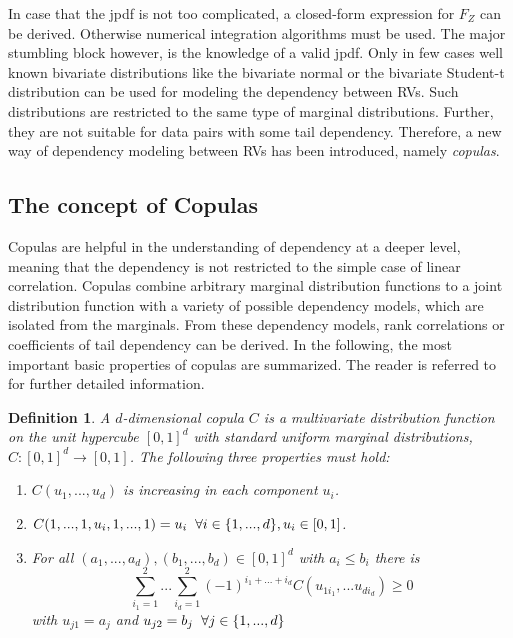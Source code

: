 \documentclass[a4paper]{article}
\begin{document}
In case that the jpdf is not too complicated, a closed-form expression for $F_Z$ can be derived. Otherwise numerical integration algorithms must be used. The major stumbling block however, is the knowledge of a valid jpdf. Only in few cases well known bivariate distributions like the bivariate normal or the bivariate Student-t distribution can be used for modeling the dependency between RVs. Such distributions are restricted to the same type of marginal distributions. Further, they are not suitable for data pairs with some tail dependency. Therefore, a new way of dependency modeling between RVs has been introduced, namely {\it copulas}.
 

\subsection{The concept of Copulas}
Copulas are helpful in the understanding of dependency at a deeper level, meaning that the dependency is not restricted to the simple case of linear correlation. Copulas combine arbitrary marginal distribution functions to a joint distribution function with a variety of possible dependency models, which are isolated from the marginals. From these dependency models, rank correlations or coefficients of tail dependency can be derived. In the following, the most important basic properties of copulas are summarized. The reader is referred to \cite{NEL06,MFE05} for further detailed information. 

\newtheorem{definition}{Definition}
\begin{definition}
	A $d$-dimensional copula $C$ is a multivariate distribution function on the unit hypercube $[0,1]^d$ with standard uniform marginal distributions, $C:[0,1]^d \rightarrow [0,1]$. The following three properties must hold:
	\begin{enumerate}
		\item $C(u_1,...,u_d)$ is increasing in each component $u_i$.
		\item $C(1,...,1,u_i,1,...,1)=u_i \hspace{0.2cm} \forall i \in \{1,...,d\}, u_i \in [0,1]$.
		\item For all $(a_1,...,a_d),(b_1,...,b_d) \in [0,1]^d$ with $a_i \le b_i$ there is
		\begin{displaymath}
			\sum_{i_1=1}^2 ... \sum_{i_d=1}^2 (-1)^{i_1+...+i_d}C(u_{1i_1},...u_{di_d}) \ge 0
		\end{displaymath}
	    with $u_{j1}=a_j$ and $u_{j2}=b_j \hspace{0.2cm} \forall j \in \{1,...,d\}$
	\end{enumerate}
\end{definition}
\end{document}
